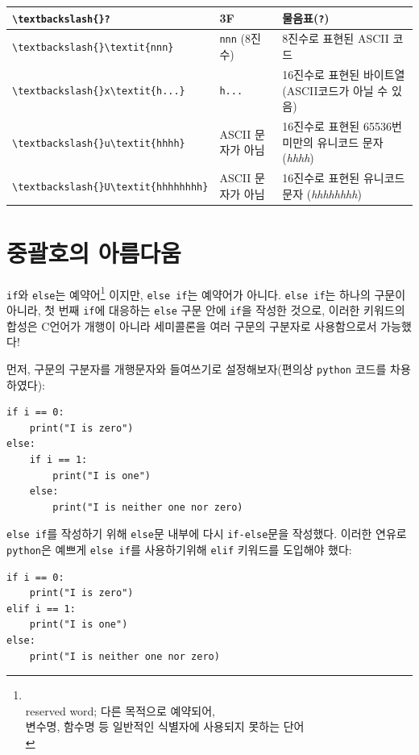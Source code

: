 \documentclass[a4paper,12pt]{book}
\newcommand{\V}[1]{\Verb|#1|}
\begin{document}
\begin{appendices}
\begin{longtable}{ || m{6em} | m{10em} | m{13em} || }
        \hline\V{\textbackslash{}?}                  & 3F                & 물음표(\V{?})                                                \\
        \hline\V{\textbackslash{}\textit{nnn}}       & \V{nnn} (8진수)   & 8진수로 표현된 ASCII 코드                                    \\
        \hline\V{\textbackslash{}x\textit{h...}}     & \V{h...}          & 16진수로 표현된 바이트열 (ASCII코드가 아닐 수 있음)          \\
        \hline\V{\textbackslash{}u\textit{hhhh}}     & ASCII 문자가 아님 & 16진수로 표현된 65536번 미만의 유니코드 문자 (\textit{hhhh}) \\
        \hline\V{\textbackslash{}U\textit{hhhhhhhh}} & ASCII 문자가 아님 & 16진수로 표현된 유니코드 문자 (\textit{hhhhhhhh})            \\
        \hline
    \end{longtable}
\endgroup


\section{중괄호의 아름다움}
\label{sec:code-beauty}

\V{if}와 \V{else}는 예약어\footnote{ \\
    reserved word; 다른 목적으로 예약되어, \\
    변수명, 함수명 등 일반적인 식별자에 사용되지 못하는 단어 \\
}
이지만, \V{else if}는 예약어가 아니다.
\V{else if}는 하나의 구문이 아니라,
첫 번째 \V{if}에 대응하는 \V{else} 구문 안에 \V{if}을 작성한 것으로,
이러한 키워드의 합성은 C언어가 개행이 아니라 세미콜론을
여러 구문의 구분자로 사용함으로서 가능했다!

먼저, 구문의 구분자를 개행문자와 들여쓰기로 설정해보자(편의상 \V{python} 코드를 차용하였다):

\begin{lstlisting}
if i == 0:
    print("I is zero")
else:
    if i == 1:
        print("I is one")
    else:
        print("I is neither one nor zero)
\end{lstlisting}

\V{else if}를 작성하기 위해 \V{else}문 내부에 다시 \V{if-else}문을 작성했다.
이러한 연유로 \V{python}은 예쁘게 \V{else if}를 사용하기위해 \V{elif} 키워드를 도입해야 했다:

\begin{lstlisting}
if i == 0:
    print("I is zero")
elif i == 1:
    print("I is one")
else:
    print("I is neither one nor zero)
\end{lstlisting}


\end{appendices}
\end{document}
